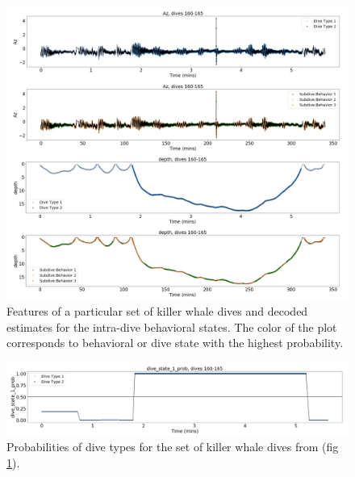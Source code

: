 \begin{figure}[ht]
	\centering
	\includegraphics[width=5in]{../Plots/labeled_dives.png}
	\caption{Features of a particular set of killer whale dives and decoded estimates for the intra-dive behavioral states. The color of the plot corresponds to behavioral or dive state with the highest probability.}
	\label{fig:labeled_dives}
\end{figure}
%
\begin{figure}[ht]
	\centering
	\includegraphics[width=5in]{../Plots/Coarse_state_probs.png}
	\caption{Probabilities of dive types for the set of killer whale dives from (fig \ref{fig:labeled_dives}).}
	\label{fig:coarse_probs}
\end{figure}
%
